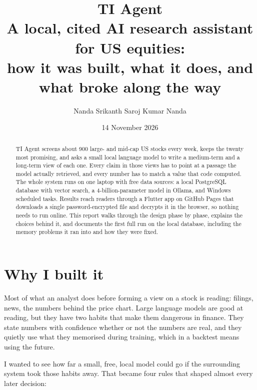 \documentclass[11pt,a4paper]{article}
\title{\textbf{TI Agent}\\[4pt]\large A local, cited AI research assistant for US equities:\\how it was built, what it does, and what broke along the way}
\author{Nanda Srikanth Saroj Kumar Nanda}
\date{14 November 2026}
\begin{document}
\maketitle

\begin{abstract}
TI Agent screens about 900 large- and mid-cap US stocks every week, keeps the twenty most promising,
and asks a small local language model to write a medium-term and a long-term view of each one. Every
claim in those views has to point at a passage the model actually retrieved, and every number has to
match a value that code computed. The whole system runs on one laptop with free data sources: a local
PostgreSQL database with vector search, a 4-billion-parameter model in Ollama, and Windows scheduled
tasks. Results reach readers through a Flutter app on GitHub Pages that downloads a single
password-encrypted file and decrypts it in the browser, so nothing needs to run online. This report
walks through the design phase by phase, explains the choices behind it, and documents the first full
run on the local database, including the memory problems it ran into and how they were fixed.
\end{abstract}

\begin{center}
\end{center}

\tableofcontents
\newpage

\section{Why I built it}

Most of what an analyst does before forming a view on a stock is reading: filings, news, the numbers
behind the price chart. Large language models are good at reading, but they have two habits that make
them dangerous in finance. They state numbers with confidence whether or not the numbers are real, and
they quietly use what they memorised during training, which in a backtest means using the future.

I wanted to see how far a small, free, local model could go if the surrounding system took those habits
away. That became four rules that shaped almost every later decision:
\end{document}
